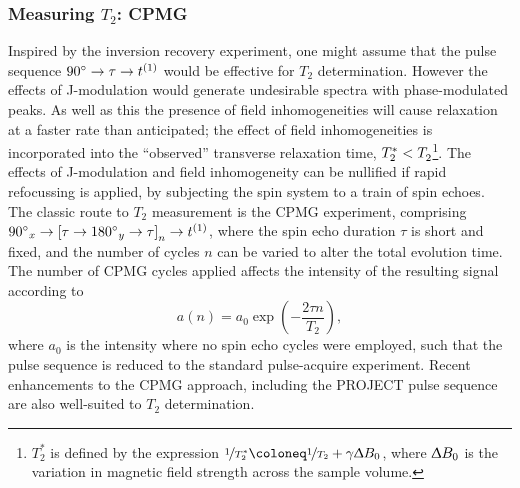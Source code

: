 \subsubsection{Measuring $T_2$: \acs{CPMG}}
\label{subsec:cpmg}
Inspired by the inversion recovery experiment, one might assume
that the pulse sequence $\ang{90} \rightarrow \tau \rightarrow t^{(1)}$ would be
effective for  $T_2$ determination. However the effects of J-modulation would
generate undesirable spectra with phase-modulated peaks. As well as this the
presence of field inhomogeneities will cause relaxation at a faster rate than
anticipated; the effect of field inhomogeneities is incorporated into the
``observed'' transverse relaxation time, $T_2^* < T_2^{\vphantom{*}}$\footnote{
    $T_2^*$ is defined by the expression
    $\nicefrac{1}{T_2^*} \coloneq \nicefrac{1}{T_2} + \gamma \Updelta B_0$,
    where $\Updelta B_0$ is the variation in magnetic field strength across the
    sample volume.
}\cite{Chavhan2009}. The effects of
J-modulation and field inhomogeneity can be nullified if rapid refocussing is
applied, by subjecting the spin system to a train of spin echoes. The classic
route to $T_2$ measurement is the \ac{CPMG}
experiment\cite{Carr1954,Meiboom1958}, comprising $\ang{90}_x \rightarrow
\left[ \tau \rightarrow \ang{180}_y \rightarrow \tau \right]_n \rightarrow
t^{(1)}$, where the spin echo duration $\tau$ is short and fixed, and the number
of cycles $n$ can be varied to alter the total evolution time. The number of
\ac{CPMG} cycles applied affects the intensity of the resulting signal
according to
\begin{equation}
    a(n) = a_0 \exp\left(-\frac{2 \tau n}{T_2}\right),
\end{equation}
where $a_0$ is the intensity where no spin echo cycles were employed, such that
the pulse sequence is reduced to the standard pulse-acquire experiment. Recent
enhancements to the \ac{CPMG} approach, including the \ac{PROJECT} pulse
sequence\cite{Aguilar2012} are also well-suited to $T_2$ determination.

